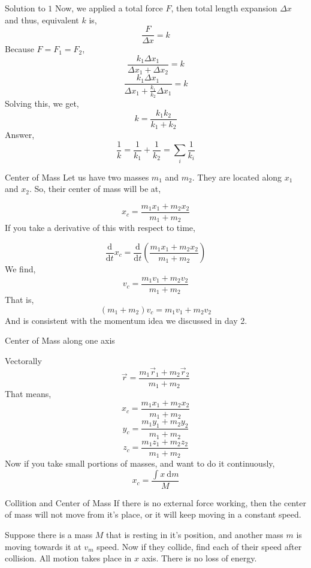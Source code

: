 \documentclass[9pt,serif]{beamer}
\newcommand{\prob}[1]{ \begin{problem.} #1 \end{problem.}}
\newcommand{\draw}[3]{ \begin{figure}[hbt!] \centering
 \fontsize{35pt}{20pt}\selectfont \resizebox{#1 \textwidth}{!}{
{#2.pdf_tex}}\caption{#3} \label{#3} \end{figure} }
\newcommand{\sides}[2]{ \begin{minipage}{0.5\textwidth} #1
    \end{minipage}\hfill%
\begin{minipage}{0.5\textwidth} #2 \end{minipage} }
\begin{document}
\begin{frame}
    {Solution to $1$ }
    Now, we applied a total force $F$, then total length expansion $\Delta x$ and thus, equivalent $k$ is, 
    \[ \frac{F}{\Delta x} = k \]
    Because $F = F_1 = F_2$, 
    \[ \frac{k_1 \Delta x_1}{\Delta x_1 + \Delta x_2} = k \]
   \[ \frac{k_1 \Delta x_1}{ \Delta x_1 + \frac{k_1}{k_2} \Delta x_1 } = k \]
   Solving this, we get, 
  \[ k = \frac{k_1 k_2 }{k_1 + k_2} \]
   Answer, 
   \[ \boxed{ \frac{1}{k} = \frac{1}{k_1} + \frac{1}{k_2} = \sum_{i} \frac{1}{k_i}} \]
   
   
\end{frame}


\begin{frame}
    {Center of Mass}
    Let us have two masses $m_1$ and $m_2$. They are located along $x_1 $ and $x_2$. So, their center of mass will be at, 
    
    \[ x_c = \frac{m_1x_1 + m_2 x_2 }{m_1 + m_2} \]
    If you take a derivative of  this with respect to time, 

    \[ \frac{\mathrm{d} }{\mathrm{d} t} x_c = \frac{\mathrm{d} }{\mathrm{d} t} \left(\frac{m_1x_1 + m_2 x_2 }{m_1 + m_2}\right) \] 
    We find, 
    \[ v_c = \frac{m_1 v_1 + m_2 v_2}{ m_1 + m_2} \]
    That is, 
    \[ \left( m_1 + m_2 \right) v_c = m_1 v_1 + m_2 v_2 \]
    And is consistent with the momentum idea we discussed in day 2. 
\end{frame}

\begin{frame}
    {Center of Mass along one axis}
    \draw{0.7}{com}{}
\end{frame}

\begin{frame}
    {Vectorally}
    \[ \vec r = \frac{m_1 \vec r_1 + m_2 \vec r_2 }{m_1 + m_2} \]
\pause
That means, 
\[ x_c =   \frac{m_1x_1 + m_2 x_2 }{m_1 + m_2} \]
\[ y_c =   \frac{m_1y_1 + m_2 y_2 }{m_1 + m_2} \]
\[ z_c =  \frac{m_1z_1 + m_2 z_2 }{m_1 + m_2}  \]
\pause
Now if you take small portions of masses, and want to do it continuously,
\[ x_c = \frac{\int x \ \mathrm{d} m}{M} \]

\end{frame}


\begin{frame}
    {Collition and Center of Mass}
    If there is no external force working, then the center of mass will not move from it's place, or it will keep moving in a constant speed.  
    \sides{
    \prob{Suppose there is a mass $M$ that is resting in it's position, and another mass $m$ is moving towards it at $v_m$ speed. Now if they collide, find each of their speed after collision. All motion takes place in $x$ axis. There is no loss of energy.}}{\draw{1}{prob2-1}{}} 
\end{frame}
\end{document}
